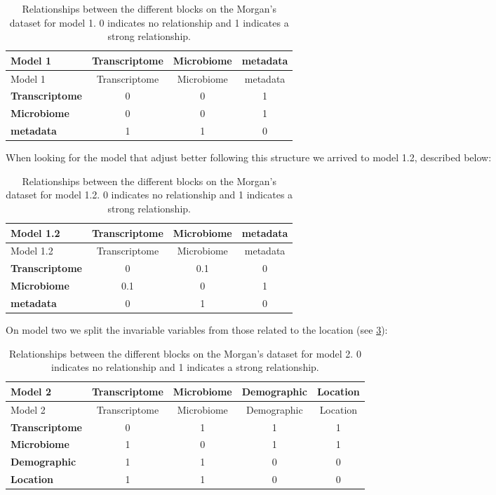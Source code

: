 \documentclass[
  a4paper,
]{book}
\begin{document}
\begin{longtable}[]{@{}lccc@{}}
\caption{\label{tab:morgan-model1} Relationships between the different blocks on the Morgan's dataset for model 1. 0 indicates no relationship and 1 indicates a strong relationship.}\tabularnewline
\toprule
Model 1 & Transcriptome & Microbiome & metadata \\
\midrule
\endfirsthead
\toprule
Model 1 & Transcriptome & Microbiome & metadata \\
\midrule
\endhead
\textbf{Transcriptome} & 0 & 0 & 1 \\
\textbf{Microbiome} & 0 & 0 & 1 \\
\textbf{metadata} & 1 & 1 & 0 \\
\bottomrule
\end{longtable}

When looking for the model that adjust better following this structure we arrived to model 1.2, described below:

\begin{longtable}[]{@{}lccc@{}}
\caption{\label{tab:morgan-model1-2} Relationships between the different blocks on the Morgan's dataset for model 1.2. 0 indicates no relationship and 1 indicates a strong relationship.}\tabularnewline
\toprule
Model 1.2 & Transcriptome & Microbiome & metadata \\
\midrule
\endfirsthead
\toprule
Model 1.2 & Transcriptome & Microbiome & metadata \\
\midrule
\endhead
\textbf{Transcriptome} & 0 & 0.1 & 0 \\
\textbf{Microbiome} & 0.1 & 0 & 1 \\
\textbf{metadata} & 0 & 1 & 0 \\
\bottomrule
\end{longtable}

On model two we split the invariable variables from those related to the location (see \ref{tab:morgan-model2}):

\begin{longtable}[]{@{}lcccc@{}}
\caption{\label{tab:morgan-model2} Relationships between the different blocks on the Morgan's dataset for model 2. 0 indicates no relationship and 1 indicates a strong relationship.}\tabularnewline
\toprule
Model 2 & Transcriptome & Microbiome & Demographic & Location \\
\midrule
\endfirsthead
\toprule
Model 2 & Transcriptome & Microbiome & Demographic & Location \\
\midrule
\endhead
\textbf{Transcriptome} & 0 & 1 & 1 & 1 \\
\textbf{Microbiome} & 1 & 0 & 1 & 1 \\
\textbf{Demographic} & 1 & 1 & 0 & 0 \\
\textbf{Location} & 1 & 1 & 0 & 0 \\
\bottomrule
\end{longtable}
\end{document}
